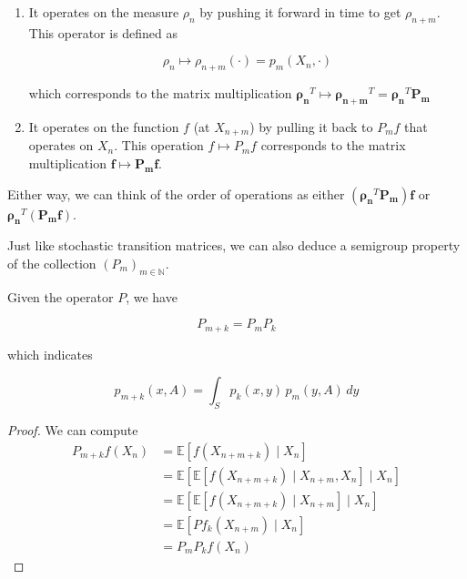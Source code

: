 \documentclass{article}
\begin{document}
  \begin{enumerate}
    \item It operates on the measure $\rho_n$ by pushing it forward in time to get $\rho_{n + m}$. This operator is defined as 

      \[\rho_n \mapsto \rho_{n + m}(\cdot) = p_m (X_n, \cdot)\]

    which corresponds to the matrix multiplication $\boldsymbol{\rho_n}^T \mapsto \boldsymbol{\rho_{n + m}}^T = \boldsymbol{\rho_{n}}^T \mathbf{P_m}$

    \item It operates on the function $f$ (at $X_{n + m}$) by pulling it back to $P_m f$ that operates on $X_n$. This operation $f \mapsto P_m f$ corresponds to the matrix multiplication $\mathbf{f} \mapsto \mathbf{P_m} \mathbf{f}$. 
  \end{enumerate}
  Either way, we can think of the order of operations as either $(\boldsymbol{\rho_n}^T \mathbf{P_m}) \mathbf{f}$ or $\boldsymbol{\rho_n}^T (\mathbf{P_m} \mathbf{f})$. 

  Just like stochastic transition matrices, we can also deduce a semigroup property of the collection $(P_m)_{m \in \mathbb{N}}$. 

  \begin{lemma}
    Given the operator $P$, we have 

      \[P_{m + k} = P_m P_k\]

    which indicates 

      \[p_{m + k} (x, A) = \int_S p_k (x, y) \, p_m (y, A) \,dy\]
  \end{lemma}
  \begin{proof}
    We can compute 
    \begin{align*}
      P_{m + k} f (X_n) & = \mathbb{E}[ f (X_{n + m + k}) \mid X_{n}] \\
      & = \mathbb{E}[ \mathbb{E}[ f(X_{n + m + k}) \mid X_{n + m}, X_n] \mid X_n] \\
      & = \mathbb{E}[ \mathbb{E}[ f(X_{n + m + k}) \mid X_{n + m}] \mid X_n] \\ 
      & = \mathbb{E}[ P f_k (X_{n + m}) \mid X_n] \\ 
      & = P_m P_k f (X_n)
    \end{align*}
  \end{proof}
\end{document}
